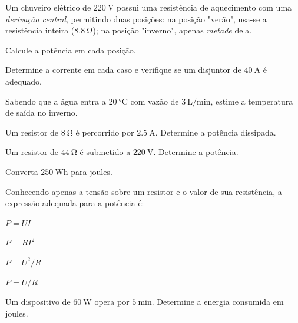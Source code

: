 \begin{questao}[3]{}

Um chuveiro elétrico de $\SI{220}{\volt}$ possui uma resistência de aquecimento
com uma \emph{derivação central}, permitindo duas posições: na posição "verão",
usa-se a resistência inteira ($\SI{8.8}{\ohm}$); na posição "inverno", apenas
\emph{metade} dela.
\begin{itensq}
\item Calcule a potência em cada posição.
\item Determine a corrente em cada caso e verifique se um disjuntor de
      $\SI{40}{\ampere}$ é adequado.
\item Sabendo que a água entra a $\SI{20}{\celsius}$ com vazão de
      $\SI{3}{\liter\per\minute}$, estime a temperatura de saída no inverno.
\end{itensq}


\end{questao}

\blocofixacao
\begin{questao}[1]{}

Um resistor de $\SI{8}{\ohm}$ é percorrido por $\SI{2.5}{\ampere}$. Determine a
potência dissipada.


\end{questao}
\begin{questao}[1]{}

Um resistor de $\SI{44}{\ohm}$ é submetido a $\SI{220}{\volt}$. Determine a
potência.


\end{questao}
\begin{questao}[1]{}

Converta $\SI{250}{\watt\hour}$ para joules.


\end{questao}
\begin{questao}[1]{}

Conhecendo apenas a tensão sobre um resistor e o valor de sua resistência, a
expressão adequada para a potência é:
\begin{alternativas}[2]
\item $P=UI$
\item $P=RI^{2}$
\item $P=U^{2}/R$
\item $P=U/R$
\end{alternativas}


\end{questao}
\begin{questao}[1]{}

Um dispositivo de $\SI{60}{\watt}$ opera por $\SI{5}{\minute}$. Determine a
energia consumida em joules.


\end{questao}

